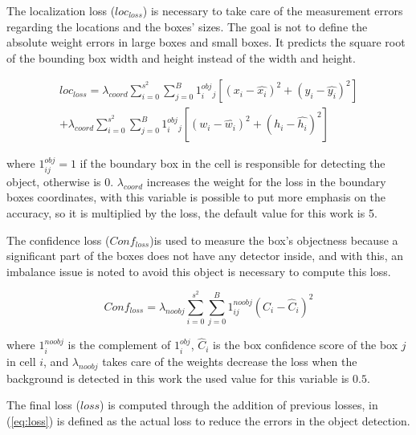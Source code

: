 The localization loss ($loc_{loss}$) is necessary to take care of the measurement errors regarding the locations and the boxes' sizes. The goal is not to define the absolute weight errors in large boxes and small boxes. It predicts the square root of the bounding box width and height instead of the width and height. 

\begin{equation}
\label{eq:localization_loss}
\begin{aligned}
    loc_{loss} = \lambda_{coord}\sum_{i=0}^{s^2}\sum_{j=0}^{B}1^{obj}_i_j\left [ \left ( x_i - \hat{x_i} \right )^2  + (y_i-\hat{y_i})^2 \right ] \\ 
    + \lambda_{coord}\sum_{i=0}^{s^2}\sum_{j=0}^{B}1^{obj}_i_j\left [ \left ( w_i - \hat{w_i} \right )^2  + (h_i-\hat{h_i})^2 \right ] 
    \end{aligned}
\end{equation}

where $1_{ij}^{obj} = 1$ if the boundary box in the cell is responsible for detecting the object, otherwise is 0. $\lambda_{coord}$ increases the weight for the loss in the boundary boxes coordinates, with this variable is possible to put more emphasis on the accuracy, so it is multiplied by the loss, the default value for this work is 5. 

The confidence loss ($Conf_{loss}$)is used to measure the box's objectness because a significant part of the boxes does not have any detector inside, and with this, an imbalance issue is noted to avoid this object is necessary to compute this loss. 

\begin{equation}
    \label{eq:confidence_loss}
    Conf_{loss} = \lambda_{noobj}\sum_{i=0}^{s^2}\sum_{j=0}^{B}1^{noobj}_{ij}\left ( C_i - \hat{C}_i \right )^2
\end{equation}

where $1^{noobj}_i$ is the complement of $1^{obj}_i$, $\hat{C}_i$ is the box confidence score of the box $j$ in cell $i$, and $\lambda_{noobj}$ takes care of the weights decrease the loss when the background is detected in this work the used value for this variable is $0.5$. 

The final loss ($loss$) is computed through the addition of previous losses, in (\ref{eq:loss}) is defined as the actual loss to reduce the errors in the object detection.

